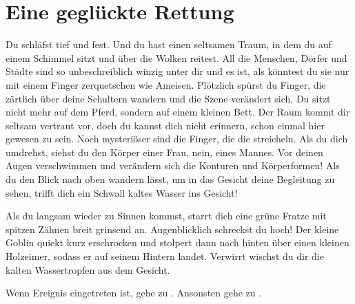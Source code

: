 \chapter*{Eine geglückte Rettung}


Du schläfst tief und fest. Und du hast einen seltsamen Traum, in dem du auf einem Schimmel sitzt und über die Wolken reitest. All die Menschen, Dörfer und Städte sind so unbeschreiblich winzig unter dir und es ist, als könntest du sie nur mit einem Finger zerquetschen wie Ameisen. Plötzlich spürst du Finger, die zärtlich über deine Schultern wandern und die Szene verändert sich. Du sitzt nicht mehr auf dem Pferd, sondern auf einem kleinen Bett. Der Raum kommt dir seltsam vertraut vor, doch du kannst dich nicht erinnern, schon einmal hier gewesen zu sein. Noch mysteriöser sind die Finger, die die streicheln. Als du dich umdrehst, siehst du den Körper einer Frau, nein, eines Mannes. Vor deinen Augen verschwimmen und verändern sich die Konturen und Körperformen! Als du den Blick nach oben wandern lässt, um in das Gesicht deine Begleitung zu sehen, trifft dich ein Schwall kaltes Wasser ins Gesicht!

Als du langsam wieder zu Sinnen kommst, starrt dich eine grüne Fratze mit spitzen Zähnen breit grinsend an. %
Augenblicklich schreckst du hoch!
Der kleine Goblin quiekt kurz erschrocken und stolpert dann nach hinten über einen kleinen Holzeimer, sodass er auf seinem Hintern landet. Verwirrt wischst du dir die kalten Wassertropfen aus dem Gesicht.

Wenn Ereignis  eingetreten ist, gehe zu .
Ansonsten gehe zu .

